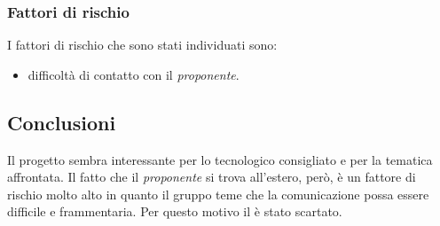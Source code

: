 \documentclass[../StudioDiFattibilita.tex]{subfiles}
\begin{document}
			\subsubsection{Fattori di rischio}
			I fattori di rischio che sono stati individuati sono:
			\begin{itemize}
				\item difficoltà di contatto con il \textit{proponente}.
			\end{itemize}
			\subsection{Conclusioni}
			Il progetto sembra interessante per lo  tecnologico consigliato e per la tematica affrontata. Il fatto che il \textit{proponente} si trova all'estero, però, è un fattore di rischio molto alto in quanto il gruppo teme che la comunicazione possa essere difficile e frammentaria. Per questo motivo il  è stato scartato.
\end{document}
